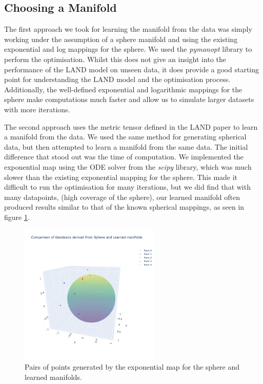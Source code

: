 \documentclass{article}
\begin{document}
\subsection{Choosing a Manifold}
The first approach we took for learning the manifold from the data was simply working under the assumption of a sphere manifold and using the existing exponential and log mappings for the sphere. We used the \textit{pymanopt} library to perform the optimisation. Whilst this does not give an insight into the performance of the LAND model on unseen data, it does provide a good starting point for understanding the LAND model and the optimisation process. Additionally, the well-defined exponential and logarithmic mappings for the sphere make computations much faster and allow us to simulate larger datasets with more iterations.

The second approach uses the metric tensor defined in the LAND paper to learn a manifold from the data. We used the same method for generating spherical data, but then attempted to learn a manifold from the same data. The initial difference that stood out was the time of computation. We implemented the exponential map using the ODE solver from the \textit{scipy} library, which was much slower than the existing exponential mapping for the sphere. This made it difficult to run the optimisation for many iterations, but we did find that with many datapoints, (high coverage of the sphere), our learned manifold often produced results similar to that of the known spherical mappings, as seen in figure \ref{fig:comparison}.

\begin{figure}[h]
    \centering
    \includegraphics[width=0.6\textwidth]{plots/comparison.png}
    \caption{Pairs of points generated by the exponential map for the sphere and learned manifolds.}
    \label{fig:comparison}
\end{figure}
\end{document}
